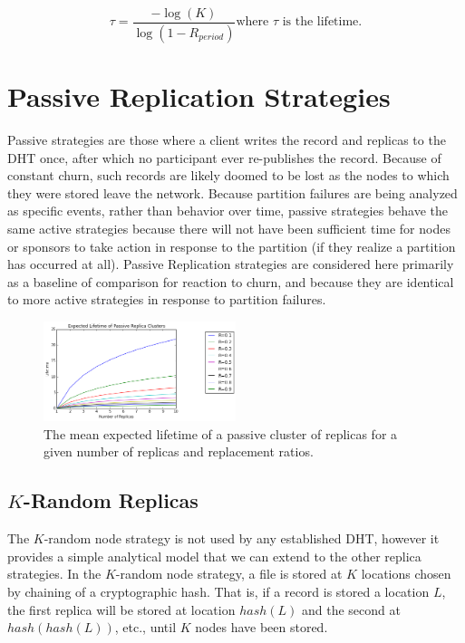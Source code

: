 	\begin{equation}
		\tau = \frac{-\log(K)}{\log(1-R_{period})}
		\mbox{where $\tau$ is the lifetime.}
		\label{eqlifetime}
	\end{equation}
	
	
	\section{Passive Replication Strategies}
	
	Passive strategies are those where a client writes the record and replicas to the DHT once, after which no participant ever re-publishes the record.
	Because of constant churn, such records are likely doomed to be lost as the nodes to which they were stored leave the network.
	Because partition failures are being analyzed as specific events, rather than behavior over time, passive strategies behave the same active strategies because there will not have been sufficient time for nodes or sponsors to take action in response to the partition (if they realize a partition has occurred at all).
	Passive Replication strategies are considered here primarily as a baseline of comparison for reaction to churn, and because they are identical to more active strategies in response to partition failures. 
	
	
	\begin{figure}[h!]
		\includegraphics[width=0.5\textwidth]{figs/lifetime}
		\caption{The mean expected lifetime of a passive cluster of replicas for a given number of replicas and replacement ratios.}
	\end{figure}
	
	\subsection{$K$-Random Replicas}
	The $K$-random node strategy is not used by any established DHT, however it provides a simple analytical model that we can extend to the other replica strategies.
	In the $K$-random node strategy, a file is stored at $K$ locations chosen by chaining of a cryptographic hash.
	That is, if a record is stored a location $L$, the first replica will be stored at location $hash(L)$ and the second at $hash(hash(L))$, etc., until $K$ nodes have been stored.
	
